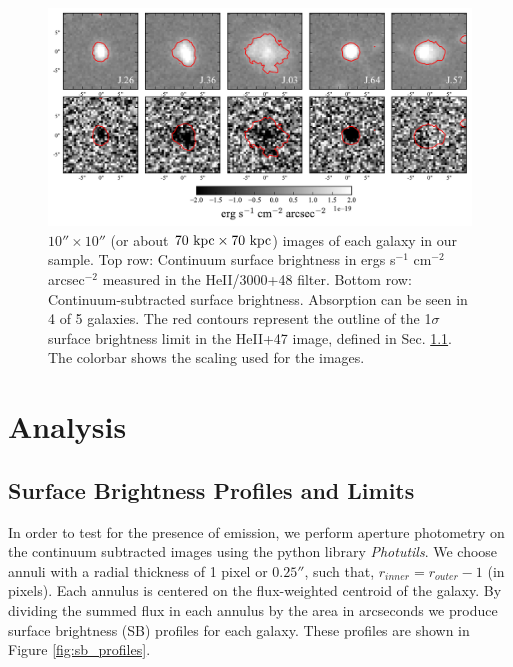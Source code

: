 \documentclass[twocolumn]{aastex61}
\begin{document}
\begin{figure}[!htb]
\centering
\includegraphics[scale=0.7]{../Figures/stamps.pdf}
\caption{ $10'' \times 10''$ (or about $70 \rm \ kpc \times 70 \rm \ kpc $) images of each galaxy in our sample. Top row: Continuum surface brightness in ergs s$^{-1}$ cm$^{-2}$ arcsec$^{-2}$ measured in the HeII/3000+48 filter. Bottom row: Continuum-subtracted  surface brightness.  Absorption can be seen in 4 of 5 galaxies. The red contours represent the outline of the 1$\sigma$ surface brightness limit in the HeII+47 image, defined in Sec. \ref{sec.sb}. The colorbar shows the scaling used for the  images.}
\label{fig:stamp_images}
\end{figure}

\section{Analysis} \label{sec:analysis}

\subsection{Surface Brightness Profiles and Limits}\label{sec.sb}

In order to test for the presence of  emission, we perform aperture photometry on the continuum subtracted images using the python library \emph{Photutils}. We choose annuli with a radial thickness of 1 pixel or $0.25 ''$, such that, $r_{inner}=r_{outer}-1$ (in pixels). Each annulus is centered on the flux-weighted centroid of the galaxy. By dividing the summed flux in each annulus by the area in arcseconds we produce surface brightness (SB) profiles for each galaxy. These profiles are shown in Figure \ref{fig:sb_profiles}. 
\end{document}

